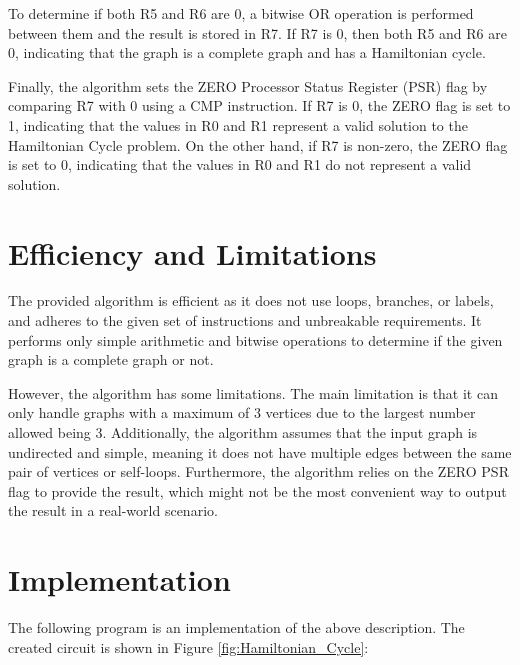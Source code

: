 To determine if both R5 and R6 are 0, a bitwise OR operation is performed between them and the result is stored in R7. If R7 is 0, then both R5 and R6 are 0, indicating that the graph is a complete graph and has a Hamiltonian cycle.

Finally, the algorithm sets the ZERO Processor Status Register (PSR) flag by comparing R7 with 0 using a CMP instruction. If R7 is 0, the ZERO flag is set to 1, indicating that the values in R0 and R1 represent a valid solution to the Hamiltonian Cycle problem. On the other hand, if R7 is non-zero, the ZERO flag is set to 0, indicating that the values in R0 and R1 do not represent a valid solution.

\section{Efficiency and Limitations}

The provided algorithm is efficient as it does not use loops, branches, or labels, and adheres to the given set of instructions and unbreakable requirements. It performs only simple arithmetic and bitwise operations to determine if the given graph is a complete graph or not.

However, the algorithm has some limitations. The main limitation is that it can only handle graphs with a maximum of 3 vertices due to the largest number allowed being 3. Additionally, the algorithm assumes that the input graph is undirected and simple, meaning it does not have multiple edges between the same pair of vertices or self-loops. Furthermore, the algorithm relies on the ZERO PSR flag to provide the result, which might not be the most convenient way to output the result in a real-world scenario.



\section{Implementation}

The following program is an implementation of the above description. The created circuit is shown in Figure \ref{fig:Hamiltonian_Cycle}:

